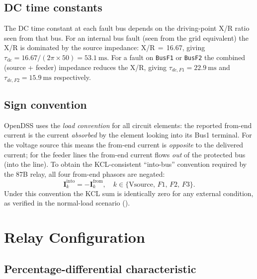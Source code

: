 \documentclass[12pt,a4paper]{article}
\begin{document}
\subsection{DC time constants}
\label{sec:tau}

The DC time constant at each fault bus depends on the driving-point X/R ratio
seen from that bus.  For an internal bus fault (seen from the grid equivalent)
the X/R is dominated by the source impedance: X/R\,$=$\,16.67, giving
$\tau_{\mathrm{dc}}=16.67/(2\pi\times50)=\SI{53.1}{\milli\second}$.  For a
fault on \texttt{BusF1} or \texttt{BusF2} the combined (source + feeder)
impedance reduces the X/R, giving $\tau_{dc,F1}=\SI{22.9}{\milli\second}$ and
$\tau_{dc,F2}=\SI{15.9}{\milli\second}$ respectively.

\subsection{Sign convention}
\label{sec:sign}

OpenDSS uses the \emph{load convention} for all circuit elements: the reported
from-end current is the current \emph{absorbed} by the element looking into its
Bus1 terminal.  For the voltage source this means the from-end current is
\emph{opposite} to the delivered current; for the feeder lines the from-end
current flows \emph{out} of the protected bus (into the line).  To obtain the
KCL-consistent ``into-bus'' convention required by the 87B relay, all four
from-end phasors are negated:
\begin{equation}
  \bm{I}_{k}^{\mathrm{into}} = -\bm{I}_{k}^{\mathrm{from}},
  \quad k \in \{\text{Vsource},\,F1,\,F2,\,F3\}.
  \label{eq:sign}
\end{equation}
Under this convention the KCL sum is identically zero for any external
condition, as verified in the normal-load scenario ().

\section{Relay Configuration}
\label{sec:relay}

\subsection{Percentage-differential characteristic}
\label{sec:pct_diff}
\end{document}
